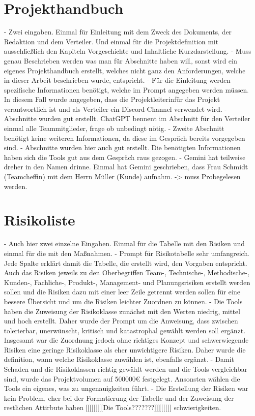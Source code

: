 \section{Projekthandbuch}  \label{CompProjekthandbuch}

- Zwei eingaben. Einmal für Einleitung mit dem Zweck des Dokuments, der Redaktion und dem Verteiler. Und einmal für die 
Projektdefinition mit ausschließlich den Kapiteln Vorgeschichte und Inhaltliche Kurzdarstellung.
- Muss genau Beschrieben werden was man für Abschnitte haben will, sonst wird ein eigenes Projekthandbuch erstellt, welches 
nicht ganz den Anforderungen, welche in dieser Arbeit beschrieben wurde, entspricht.
- Für die Einleitung werden spezifische Informationen benötigt, welche im Prompt angegeben werden müssen. In diesem Fall wurde 
angegeben, dass die Projektleiterinfür das Projekt verantwortlich ist und als Verteiler ein Discord-Channel verwendet wird.
- Abschnitte wurden gut erstellt. ChatGPT bennent im Abschnitt für den Verteiler einmal alle Teammitglieder, frage ob unbedingt nötig.
- Zweite Abschnitt benötigt keine weiteren Informationen, da diese im Gespräch bereits vorgegeben sind. 
- Abschnitte wurden hier auch gut erstellt. Die benötigten Informationen haben sich die Tools gut aus dem Gespräch raus gezogen.
- Gemini hat teilweise dreher in den Namen drinne. Einmal hat Gemini geschrieben, dass Frau Schmidt (Teamcheffin) mit dem Herrn Müller 
(Kunde) aufnahm. -> muss Probegelesen werden.

\section{Risikoliste}  \label{CompRisikoliste}

- Auch hier zwei einzelne Eingaben. Einmal für die Tabelle mit den Risiken und einmal für die mit den Maßnahmen.
- Prompt für Risikotabelle sehr umfangreich. Jede Spalte erklärt damit die Tabelle, die erstellt wird, den Vorgaben entspricht. 
Auch das Risiken jeweils zu den Oberbegriffen Team-, Technische-, Methodische-, Kunden-, Fachliche-, Produkt-, Management- und 
Planungsrisiken erstellt werden sollen und die Risiken dazu mit einer leer Zeile getrennt werden sollen für eine bessere Übersicht 
und um die Risiken leichter Zuordnen zu können.
- Die Tools haben die Zuweisung der Risikoklasse zunächst mit den Werten niedrig, mittel und hoch erstellt. Daher wurde der 
Prompt um die Anweisung, dass zwischen tolerierbar, unerwünscht, kritisch und katastrophal gewählt werden soll ergänzt.
Insgesamt war die Zuordnung jedoch ohne richtiges Konzept und schwerwiegende Risiken eine geringe Risikoklasse als eher unwichtigere
Risiken. Daher wurde die definition, wann welche Risikoklasse zuwählen ist, ebenfalls ergänzt.
- Damit Schaden und die Risikoklassen richtig gewählt werden und die Tools vergleichbar sind, wurde das Projektvolumen auf 500000€
festgelegt. Ansonsten wählen die Tools ein eigenes, was zu ungenauigkeiten führt.
- Die Erstellung der Risiken war kein Problem, eher bei der Formatierung der Tabelle und der Zuweisung der restlichen Attirbute haben
[[[[[[[[[Die Tools???????]]]]]]]]] schwierigkeiten.

